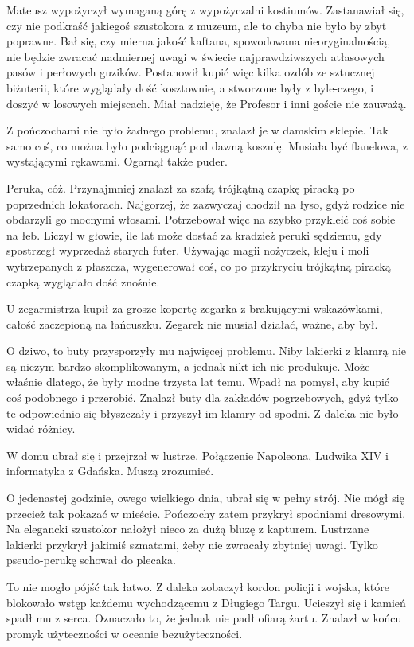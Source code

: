 \divider{}

Mateusz wypożyczył wymaganą górę z wypożyczalni kostiumów.
Zastanawiał się, czy nie podkraść jakiegoś szustokora z muzeum, ale to chyba nie było by zbyt poprawne.
Bał się, czy mierna jakość kaftana, spowodowana nieoryginalnością, nie będzie zwracać nadmiernej uwagi w świecie najprawdziwszych atłasowych pasów i perłowych guzików.
Postanowił kupić więc kilka ozdób ze sztucznej biżuterii, które wyglądały dość kosztownie, a stworzone były z
byle-czego, i doszyć w losowych miejscach. Miał nadzieję, że Profesor i inni goście nie zauważą.

Z pończochami nie było żadnego problemu, znalazł je w damskim sklepie.
Tak samo coś, co można było podciągnąć pod dawną koszulę.
Musiała być flanelowa, z wystającymi rękawami.
Ogarnął także puder.

Peruka, cóż. Przynajmniej znalazł za szafą trójkątną czapkę piracką po poprzednich lokatorach.
Najgorzej, że zazwyczaj chodził na łyso, gdyż rodzice nie obdarzyli go mocnymi włosami.
Potrzebował więc na szybko przykleić coś sobie na łeb.
Liczył w głowie, ile lat może dostać za kradzież peruki sędziemu, gdy spostrzegł wyprzedaż starych futer.
Używając magii nożyczek, kleju i moli wytrzepanych z płaszcza, wygenerował coś, co po przykryciu trójkątną piracką czapką wyglądało dość znośnie.

U zegarmistrza kupił za grosze kopertę zegarka z brakującymi wskazówkami, całość zaczepioną na łańcuszku.
Zegarek nie musiał działać, ważne, aby był.

O dziwo, to buty przysporzyły mu najwięcej problemu.
Niby lakierki z klamrą nie są niczym bardzo skomplikowanym, a jednak nikt ich nie produkuje.
Może właśnie dlatego, że były modne trzysta lat temu.
Wpadł na pomysł, aby kupić coś podobnego i przerobić.
Znalazł buty dla zakładów pogrzebowych, gdyż tylko te odpowiednio się błyszczały i przyszył im klamry od spodni.
Z daleka nie było widać różnicy.

W domu ubrał się i przejrzał w lustrze.
Połączenie Napoleona, Ludwika XIV i informatyka z Gdańska.
Muszą zrozumieć.

O jedenastej godzinie, owego wielkiego dnia, ubrał się w pełny strój.
Nie mógł się przecież tak pokazać w mieście.
Pończochy zatem przykrył spodniami dresowymi.
Na elegancki szustokor nałożył nieco za dużą bluzę z kapturem.
Lustrzane lakierki przykrył jakimiś szmatami, żeby nie zwracały zbytniej uwagi.
Tylko pseudo-perukę schował do plecaka.

To nie mogło pójść tak łatwo.
Z daleka zobaczył kordon policji i wojska, które blokowało wstęp każdemu wychodzącemu z Długiego Targu.
Ucieszył się i kamień spadł mu z serca. Oznaczało to, że jednak nie padł ofiarą żartu.
Znalazł w końcu promyk użyteczności w oceanie bezużyteczności.

